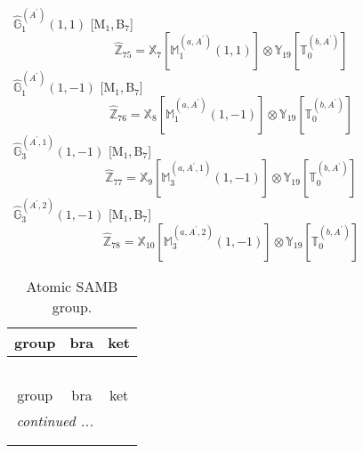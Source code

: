 \documentclass[fleqn,10pt,landscape]{article}
\begin{document}
\begin{itemize}
\noindent {} $\,\,\,\hat{\mathbb{G}}_{1}^{(A^{\prime})}(1,1)$ [M$_{1}$,\,B$_{7}$]
\begin{dmath*}
\hat{\mathbb{Z}}_{75}=\mathbb{X}_{7}[\mathbb{M}_{1}^{(a,A^{\prime})}(1,1)] \otimes\mathbb{Y}_{19}[\mathbb{T}_{0}^{(b,A^{\prime})}]
\end{dmath*}
\vspace{4mm}
\noindent {} $\,\,\,\hat{\mathbb{G}}_{1}^{(A^{\prime})}(1,-1)$ [M$_{1}$,\,B$_{7}$]
\begin{dmath*}
\hat{\mathbb{Z}}_{76}=\mathbb{X}_{8}[\mathbb{M}_{1}^{(a,A^{\prime})}(1,-1)] \otimes\mathbb{Y}_{19}[\mathbb{T}_{0}^{(b,A^{\prime})}]
\end{dmath*}
\vspace{4mm}
\noindent {} $\,\,\,\hat{\mathbb{G}}_{3}^{(A^{\prime},1)}(1,-1)$ [M$_{1}$,\,B$_{7}$]
\begin{dmath*}
\hat{\mathbb{Z}}_{77}=\mathbb{X}_{9}[\mathbb{M}_{3}^{(a,A^{\prime},1)}(1,-1)] \otimes\mathbb{Y}_{19}[\mathbb{T}_{0}^{(b,A^{\prime})}]
\end{dmath*}
\vspace{4mm}
\noindent {} $\,\,\,\hat{\mathbb{G}}_{3}^{(A^{\prime},2)}(1,-1)$ [M$_{1}$,\,B$_{7}$]
\begin{dmath*}
\hat{\mathbb{Z}}_{78}=\mathbb{X}_{10}[\mathbb{M}_{3}^{(a,A^{\prime},2)}(1,-1)] \otimes\mathbb{Y}_{19}[\mathbb{T}_{0}^{(b,A^{\prime})}]
\end{dmath*}
\begin{center}
\renewcommand{\arraystretch}{1.3}
\begin{longtable}{c|c|c}
\caption{Atomic SAMB group.}
 \\
 \hline \hline
group & bra & ket \\ \hline \endfirsthead

\multicolumn{2}{l}{\tablename\ \thetable{}} \\
 \hline \hline
group & bra & ket \\ \hline \endhead

 \hline \hline
\multicolumn{2}{r}{\footnotesize\it continued ...} \\ \endfoot

 \hline \hline
\multicolumn{2}{r}{} \\ \endlastfoot


\end{longtable}
\end{center}
\end{itemize}
\end{document}
